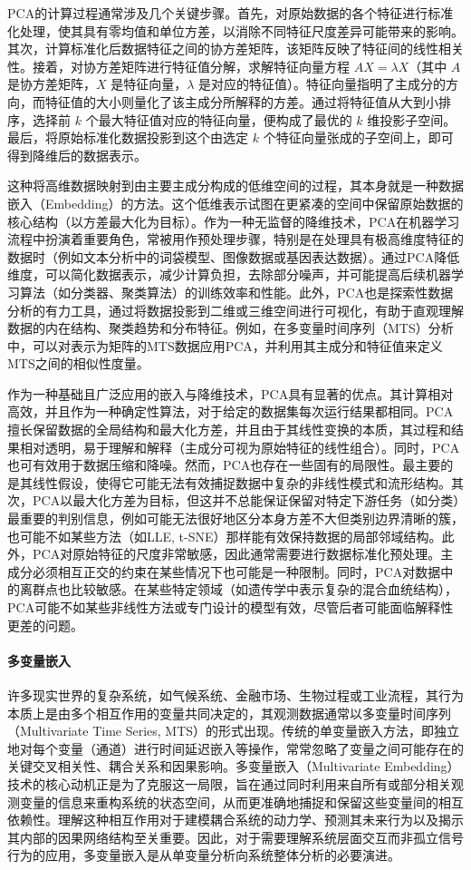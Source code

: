 PCA的计算过程通常涉及几个关键步骤。首先，对原始数据的各个特征进行标准化处理，使其具有零均值和单位方差，以消除不同特征尺度差异可能带来的影响。其次，计算标准化后数据特征之间的协方差矩阵，该矩阵反映了特征间的线性相关性。接着，对协方差矩阵进行特征值分解，求解特征向量方程 $AX=\lambda X$（其中 $A$ 是协方差矩阵，$X$ 是特征向量，$\lambda$ 是对应的特征值）。特征向量指明了主成分的方向，而特征值的大小则量化了该主成分所解释的方差。通过将特征值从大到小排序，选择前 $k$ 个最大特征值对应的特征向量，便构成了最优的 $k$ 维投影子空间。最后，将原始标准化数据投影到这个由选定 $k$ 个特征向量张成的子空间上，即可得到降维后的数据表示。

这种将高维数据映射到由主要主成分构成的低维空间的过程，其本身就是一种数据嵌入（Embedding）的方法\cite{gibson1992analytic}。这个低维表示试图在更紧凑的空间中保留原始数据的核心结构（以方差最大化为目标）。作为一种无监督的降维技术，PCA在机器学习流程中扮演着重要角色，常被用作预处理步骤，特别是在处理具有极高维度特征的数据时（例如文本分析中的词袋模型、图像数据或基因表达数据）。通过PCA降低维度，可以简化数据表示，减少计算负担，去除部分噪声，并可能提高后续机器学习算法（如分类器、聚类算法）的训练效率和性能。此外，PCA也是探索性数据分析的有力工具，通过将数据投影到二维或三维空间进行可视化，有助于直观理解数据的内在结构、聚类趋势和分布特征。例如，在多变量时间序列（MTS）分析中，可以对表示为矩阵的MTS数据应用PCA，并利用其主成分和特征值来定义MTS之间的相似性度量。

作为一种基础且广泛应用的嵌入与降维技术，PCA具有显著的优点。其计算相对高效，并且作为一种确定性算法，对于给定的数据集每次运行结果都相同。PCA擅长保留数据的全局结构和最大化方差，并且由于其线性变换的本质，其过程和结果相对透明，易于理解和解释（主成分可视为原始特征的线性组合）。同时，PCA也可有效用于数据压缩和降噪。然而，PCA也存在一些固有的局限性。最主要的是其线性假设，使得它可能无法有效捕捉数据中复杂的非线性模式和流形结构。其次，PCA以最大化方差为目标，但这并不总能保证保留对特定下游任务（如分类）最重要的判别信息，例如可能无法很好地区分本身方差不大但类别边界清晰的簇，也可能不如某些方法（如LLE, t-SNE）那样能有效保持数据的局部邻域结构。此外，PCA对原始特征的尺度非常敏感，因此通常需要进行数据标准化预处理。主成分必须相互正交的约束在某些情况下也可能是一种限制。同时，PCA对数据中的离群点也比较敏感。在某些特定领域（如遗传学中表示复杂的混合血统结构），PCA可能不如某些非线性方法或专门设计的模型有效，尽管后者可能面临解释性更差的问题。

\paragraph{多变量嵌入} %
许多现实世界的复杂系统，如气候系统、金融市场、生物过程或工业流程，其行为本质上是由多个相互作用的变量共同决定的，其观测数据通常以多变量时间序列（Multivariate Time Series, MTS）的形式出现。传统的单变量嵌入方法，即独立地对每个变量（通道）进行时间延迟嵌入等操作，常常忽略了变量之间可能存在的关键交叉相关性、耦合关系和因果影响。多变量嵌入（Multivariate Embedding）技术\cite{barnard2001embedding}的核心动机正是为了克服这一局限，旨在通过同时利用来自所有或部分相关观测变量的信息来重构系统的状态空间，从而更准确地捕捉和保留这些变量间的相互依赖性。理解这种相互作用对于建模耦合系统的动力学、预测其未来行为以及揭示其内部的因果网络结构至关重要。因此，对于需要理解系统层面交互而非孤立信号行为的应用，多变量嵌入是从单变量分析向系统整体分析的必要演进。

